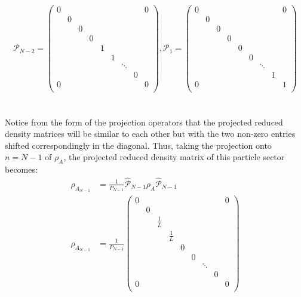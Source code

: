 \begin{equation}
\mathcal{P}_{N-2} = \begin{pmatrix} 
0 & & & & & & & & 0 \\
& 0 \\
& & 0 \\
& & & 0 \\
& & & &  1 \\
& & & & & 1 \\
& & & & &  & \ddots \\
& & & & & & &  0 \\
0 & & & & & & & & 0 \\
\end{pmatrix}
,
\mathcal{P}_{1} = \begin{pmatrix} 
0 & & & & & & & & 0 \\
& 0 \\
& & 0 \\
& & & 0 \\
& & & &  0 \\
& & & & & 0 \\
& & & & & & \ddots \\
& & & & & & &  1 \\
0 & & & & & & & &  1 \\
\end{pmatrix}
\end{equation} \\
\\
%
Notice from the form of the projection operators that the projected reduced density matrices will be similar to each other but with the two non-zero entries shifted correspondingly in the diagonal. Thus, taking the projection onto $n=N-1$ of $\rho_{A}$, the projected reduced density matrix of this particle sector becomes:
%
\begin{equation}
\begin{aligned}
\rho_{A_{N-1}} &= \frac{1}{P_{N-1}} \hat{\mathcal{P}}_{N-1} \rho_{A} \hat{\mathcal{P}}_{N-1} \\
\rho_{A_{N-1}} &= \frac{1}{P_{N-1}} \begin{pmatrix} 
0 & & & & & & & & 0 \\
& 0 \\
& & \frac{1}{L} \\
& & & \frac{1}{L} \\
& & & &  0 \\
& & & & & 0 \\
& & & & &  & \ddots \\
& & & & & & &  0 \\
0 & & & & & & & &  0 \\
\end{pmatrix} 
\end{aligned}
\end{equation}
